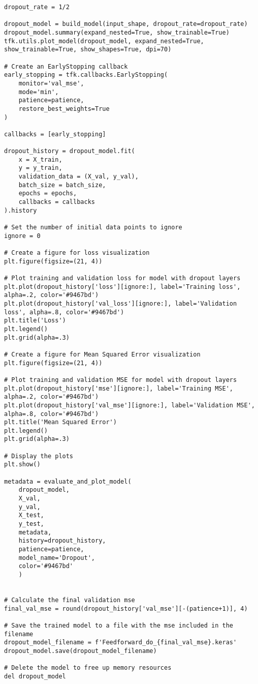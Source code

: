 \begin{lstlisting}[style=Python]
dropout_rate = 1/2

dropout_model = build_model(input_shape, dropout_rate=dropout_rate)
dropout_model.summary(expand_nested=True, show_trainable=True)
tfk.utils.plot_model(dropout_model, expand_nested=True, show_trainable=True, show_shapes=True, dpi=70)

# Create an EarlyStopping callback
early_stopping = tfk.callbacks.EarlyStopping(
    monitor='val_mse',
    mode='min',
    patience=patience,
    restore_best_weights=True
)

callbacks = [early_stopping]

dropout_history = dropout_model.fit(
    x = X_train,
    y = y_train,
    validation_data = (X_val, y_val),
    batch_size = batch_size,
    epochs = epochs,
    callbacks = callbacks
).history

# Set the number of initial data points to ignore
ignore = 0

# Create a figure for loss visualization
plt.figure(figsize=(21, 4))

# Plot training and validation loss for model with dropout layers
plt.plot(dropout_history['loss'][ignore:], label='Training loss', alpha=.2, color='#9467bd')
plt.plot(dropout_history['val_loss'][ignore:], label='Validation loss', alpha=.8, color='#9467bd')
plt.title('Loss')
plt.legend()
plt.grid(alpha=.3)

# Create a figure for Mean Squared Error visualization
plt.figure(figsize=(21, 4))

# Plot training and validation MSE for model with dropout layers
plt.plot(dropout_history['mse'][ignore:], label='Training MSE', alpha=.2, color='#9467bd')
plt.plot(dropout_history['val_mse'][ignore:], label='Validation MSE', alpha=.8, color='#9467bd')
plt.title('Mean Squared Error')
plt.legend()
plt.grid(alpha=.3)

# Display the plots
plt.show()

metadata = evaluate_and_plot_model(
    dropout_model,
    X_val,
    y_val,
    X_test,
    y_test,
    metadata,
    history=dropout_history,
    patience=patience,
    model_name='Dropout',
    color='#9467bd'
    )


# Calculate the final validation mse
final_val_mse = round(dropout_history['val_mse'][-(patience+1)], 4)

# Save the trained model to a file with the mse included in the filename
dropout_model_filename = f'Feedforward_do_{final_val_mse}.keras'
dropout_model.save(dropout_model_filename)

# Delete the model to free up memory resources
del dropout_model
\end{lstlisting}

